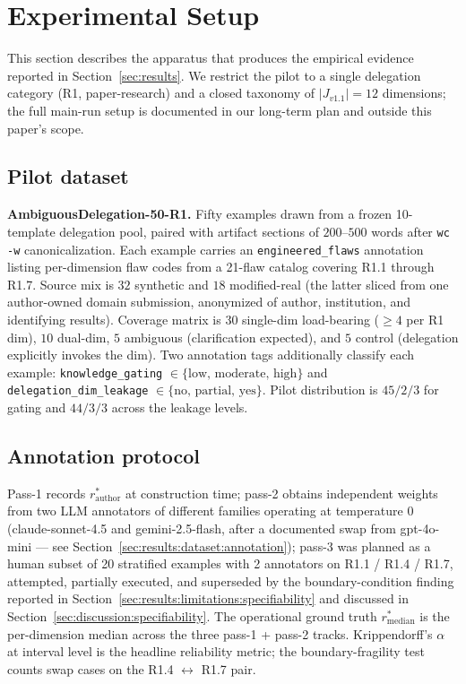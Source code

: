 \section{Experimental Setup}
\label{sec:experiments}

This section describes the apparatus that produces the empirical evidence reported in Section~\ref{sec:results}. We restrict the pilot to a single delegation category (R1, paper-research) and a closed taxonomy of $|J_{v1.1}| = 12$ dimensions; the full main-run setup is documented in our long-term plan and outside this paper's scope.

\subsection{Pilot dataset}
\label{sec:experiments:dataset}

\textbf{AmbiguousDelegation-50-R1.} Fifty examples drawn from a frozen 10-template delegation pool, paired with artifact sections of $200$--$500$ words after \texttt{wc -w} canonicalization. Each example carries an \texttt{engineered\_flaws} annotation listing per-dimension flaw codes from a 21-flaw catalog covering R1.1 through R1.7. Source mix is $32$ synthetic and $18$ modified-real (the latter sliced from one author-owned domain submission, anonymized of author, institution, and identifying results). Coverage matrix is $30$ single-dim load-bearing ($\geq 4$ per R1 dim), $10$ dual-dim, $5$ ambiguous (clarification expected), and $5$ control (delegation explicitly invokes the dim). Two annotation tags additionally classify each example: \texttt{knowledge\_gating} $\in \{\text{low, moderate, high}\}$ and \texttt{delegation\_dim\_leakage} $\in \{\text{no, partial, yes}\}$. Pilot distribution is $45/2/3$ for gating and $44/3/3$ across the leakage levels.

\subsection{Annotation protocol}
\label{sec:experiments:annotation}

Pass-1 records $r^*_{\text{author}}$ at construction time; pass-2 obtains independent weights from two LLM annotators of different families operating at temperature $0$ (claude-sonnet-4.5 and gemini-2.5-flash, after a documented swap from gpt-4o-mini --- see Section~\ref{sec:results:dataset:annotation}); pass-3 was planned as a human subset of 20 stratified examples with 2 annotators on R1.1 / R1.4 / R1.7, attempted, partially executed, and superseded by the boundary-condition finding reported in Section~\ref{sec:results:limitations:specifiability} and discussed in Section~\ref{sec:discussion:specifiability}. The operational ground truth $r^*_{\text{median}}$ is the per-dimension median across the three pass-1 + pass-2 tracks. Krippendorff's $\alpha$ at interval level is the headline reliability metric; the boundary-fragility test counts swap cases on the R1.4 $\leftrightarrow$ R1.7 pair.

